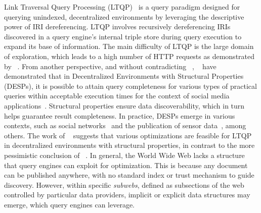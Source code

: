 Link Traversal Query Processing (LTQP)~\cite{Hartig2012} is a query paradigm designed for querying unindexed, decentralized environments by leveraging the descriptive power of IRI dereferencing.
LTQP involves recursively dereferencing IRIs discovered in a query engine's internal triple store during query execution to expand its base of information.
The main difficulty of LTQP is the large domain of exploration, which leads to a high number of HTTP requests as demonstrated by \citeauthor{hartig2016walking}~\cite{hartig2016walking}.
From another perspective, and without contradicting \citeauthor{hartig2016walking}~\cite{hartig2016walking}, \citeauthor{Taelman2023}~\cite{Taelman2023} have demonstrated that in Decentralized Environments with Structural Properties (DESPs), it is possible to attain query completeness for various types of practical queries within acceptable execution times for the context of social media applications~\cite{nielsen1993response}.
Structural properties ensure data discoverability, which in turn helps guarantee result completeness.
In practice, DESPs emerge in various contexts, such as social networks~\cite{Taelman2023} and the publication of sensor data~\cite{tam_iswc_traversalsensortree_2024}, among others.
The work of \citeauthor{Taelman2023}~\cite{Taelman2023} suggests that various optimizations are feasible for LTQP in decentralized environments with structural properties, in contrast to the more pessimistic conclusion of \citeauthor{hartig2016walking}~\cite{hartig2016walking}.
In general, the World Wide Web lacks a structure that query engines can exploit for optimization.  
This is because any document can be published anywhere, with no standard index or trust mechanism to guide discovery.  
However, within specific \emph{subwebs}, defined as subsections of the web controlled by particular data providers, implicit or explicit data structures may emerge, which query engines can leverage.

